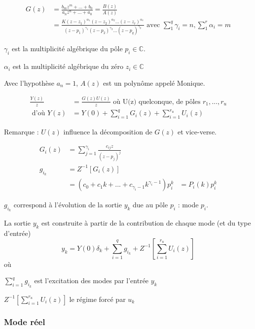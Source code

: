 \documentclass[main.tex]{subfiles}
\begin{document}
\begin{align*}
G(z) & = \frac{b_mz^m + ... + b_0}{a_nz^n + ... + a_0} = \frac{B(z)}{A(z)} \\
& = \frac{K(z-z_1)^{\alpha_1}(z-z_2)^{\alpha_2}...(z-z_r)^{\alpha_r}}{(z-p_1)^{\gamma_1}(z-p_2)^{\gamma_2}...(z-p_q)^{\gamma_q}} \text{ avec } \sum_1^q \gamma_i = n, \sum_1^r \alpha_i = m
\end{align*}

$\gamma_i$ est la multiplicité algébrique du pôle $p_i \in \mathbb{C}$.

$\alpha_i$ est la multiplicité algébrique du zéro $z_i \in \mathbb{C}$

Avec l'hypothèse $a_n=1$, $A(z)$ est un polynôme appelé Monique.

\begin{align*}
\frac{Y(z)}{z} & = \frac{G(z)U(z)}{z} \text{ où U(z) quelconque, de pôles } r_1,...,r_u \\
\text{ d'où } Y(z) & = Y(0) + \sum_{i=1}^q G_i(z) + \sum_{i=1}^{r_u}U_i(z)
\end{align*}

Remarque : $U(z)$ influence la décomposition de $G(z)$ et vice-verse.

\begin{align*}
G_i(z) & = \sum_{j=1}^{\gamma_i}\frac{c_{ij}z}{(z-p_j)^j} \\
g_{i_k} & = Z^{-1}[G_i(z)] \\
& = (c_0 + c_1k + ... + c_{\gamma_i - 1}k^{\gamma_i - 1})p_i^k
& = P_i(k)p_i^k
\end{align*}

$g_{i_k}$ correspond à l'évolution de la sortie $y_k$ due au pôle $p_i$ : mode $p_i$.

\medskip

La sortie $y_k$ est construite à partir de la contribution de chaque mode (et du type d'entrée)
\[ y_k = Y(0)\delta_k + \sum_{i=1}^q g_{i_k} + Z^{-1}[\sum_{i=1}^{r_u}U_i(z)] \]
où

$\sum_{i=1}^q g_{i_k}$ est l'excitation des modes par l'entrée $y_k$

$Z^{-1}[\sum_{i=1}^{r_u}U_i(z)]$ le régime forcé par $u_k$

\subsubsection{Mode réel}
\end{document}
